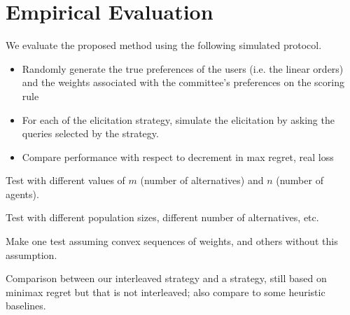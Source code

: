 \documentclass[12pt]{article}
\begin{document}
\section{Empirical Evaluation}

We evaluate the proposed method using the following simulated protocol.

\begin{itemize}
 \item Randomly generate the true preferences of the users (i.e. the linear orders) and the weights associated with the committee's preferences on the scoring rule
 \item For each of the elicitation strategy, simulate the elicitation by asking the queries selected by the strategy.
 
 \item Compare performance with respect to decrement in max regret, real loss
\end{itemize}


Test with different values of $m$ (number of alternatives) and $n$ (number of agents).

Test with different population sizes, different number of alternatives, etc.

Make one test assuming convex sequences of weights, and others without this assumption.

Comparison between our interleaved strategy and a strategy, still based on minimax regret  but that is not interleaved; also compare to some heuristic baselines.



 
\end{document}
